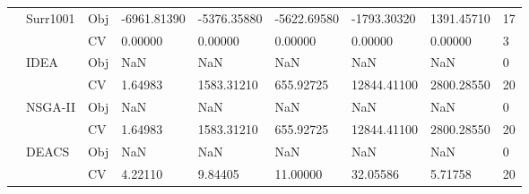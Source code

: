 \begin{table*}[!htb]
\begin{tabular}{lllllllll}
		& Surr1001                           & Obj                                & -6961.81390                        & -5376.35880                        & -5622.69580                          & -1793.30320                         & 1391.45710                        & 17               \\
		&                                    & CV                                 & 0.00000                            & 0.00000                            & 0.00000                              & 0.00000                             & 0.00000                           & 3                \\
		& IDEA                               & Obj                                & NaN                                & NaN                                & NaN                                  & NaN                                 & NaN                               & 0                \\
		&                                    & CV                                 & 1.64983                            & 1583.31210                         & 655.92725                            & 12844.41100                         & 2800.28550                        & 20               \\
		& NSGA-II                            & Obj                                & NaN                                & NaN                                & NaN                                  & NaN                                 & NaN                               & 0                \\
		&                                    & CV                                 & 1.64983                            & 1583.31210                         & 655.92725                            & 12844.41100                         & 2800.28550                        & 20               \\
		& DEACS                              & Obj                                & NaN                                & NaN                                & NaN                                  & NaN                                 & NaN                               & 0                \\
		&                                    & CV                                 & 4.22110                            & 9.84405                            & 11.00000                             & 32.05586                            & 5.71758                           & 20               \\

\end{tabular}
\end{table*}

